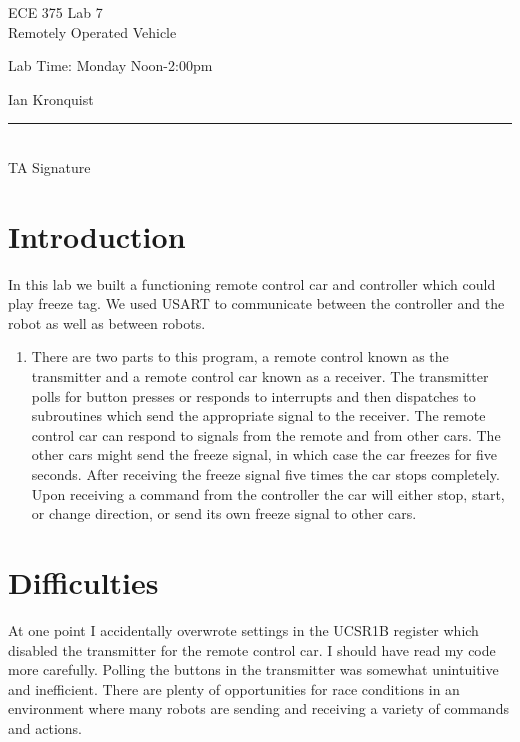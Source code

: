 \documentclass[12pt,letterpaper]{article}
\begin{document}
\begin{titlepage}
    \vspace*{4cm}
    \begin{flushright}
    {\huge
        ECE 375 Lab 7\\[1cm]
    }
    {\large
        Remotely Operated Vehicle
    }
    \end{flushright}
    \begin{flushleft}
    Lab Time: Monday Noon-2:00pm
    \end{flushleft}
    \begin{flushright}
    Ian Kronquist
    \vfill
    \rule{5in}{.5mm}\\
    TA Signature
    \end{flushright}

\end{titlepage}
\section{Introduction}
In this lab we built a functioning remote control car and controller which could play freeze tag. We used USART to communicate between the controller and the robot as well as between robots.

\begin{enumerate}
\item There are two parts to this program, a remote control known as the transmitter and a remote control car known as a receiver. The transmitter polls for button presses or responds to interrupts and then dispatches to subroutines which send the appropriate signal to the receiver. The remote control car can respond to signals from the remote and from other cars. The other cars might send the freeze signal, in which case the car freezes for five seconds. After receiving the freeze signal five times the car stops completely. Upon receiving a command from the controller the car will either stop, start, or change direction, or send its own freeze signal to other cars.

\end{enumerate}

\section{Difficulties}
At one point I accidentally overwrote settings in the UCSR1B register which disabled the transmitter for the remote control car. I should have read my code more carefully. Polling the buttons in the transmitter was somewhat unintuitive and inefficient. There are plenty of opportunities for race conditions in an environment where many robots are sending and receiving a variety of commands and actions.
\end{document}
